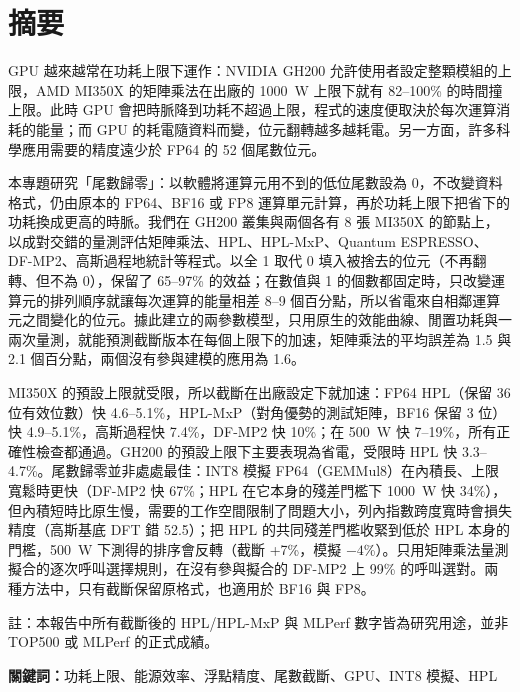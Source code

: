 \chapter*{摘要}

{\linespread{1.3}\selectfont\enlargethispage{\baselineskip}
GPU 越來越常在功耗上限下運作：NVIDIA GH200 允許使用者設定整顆模組的上限，AMD MI350X 的矩陣乘法在出廠的 1000~W 上限下就有 82–100\% 的時間撞上限。此時 GPU 會把時脈降到功耗不超過上限，程式的速度便取決於每次運算消耗的能量；而 GPU 的耗電隨資料而變，位元翻轉越多越耗電。另一方面，許多科學應用需要的精度遠少於 FP64 的 52 個尾數位元。

本專題研究「尾數歸零」：以軟體將運算元用不到的低位尾數設為 0，不改變資料格式，仍由原本的 FP64、BF16 或 FP8 運算單元計算，再於功耗上限下把省下的功耗換成更高的時脈。我們在 GH200 叢集與兩個各有 8 張 MI350X 的節點上，以成對交錯的量測評估矩陣乘法、HPL、HPL-MxP、Quantum ESPRESSO、DF-MP2、高斯過程地統計等程式。以全 1 取代 0 填入被捨去的位元（不再翻轉、但不為 0），保留了 65–97\% 的效益；在數值與 1 的個數都固定時，只改變運算元的排列順序就讓每次運算的能量相差 8–9 個百分點，所以省電來自相鄰運算元之間變化的位元。據此建立的兩參數模型，只用原生的效能曲線、閒置功耗與一兩次量測，就能預測截斷版本在每個上限下的加速，矩陣乘法的平均誤差為 1.5 與 2.1 個百分點，兩個沒有參與建模的應用為 1.6。

MI350X 的預設上限就受限，所以截斷在出廠設定下就加速：FP64 HPL（保留 36 位有效位數）快 4.6–5.1\%，HPL-MxP（對角優勢的測試矩陣，BF16 保留 3 位）快 4.9–5.1\%，高斯過程快 7.4\%，DF-MP2 快 10\%；在 500~W 快 7–19\%，所有正確性檢查都通過。GH200 的預設上限下主要表現為省電，受限時 HPL 快 3.3–4.7\%。尾數歸零並非處處最佳：INT8 模擬 FP64（GEMMul8）在內積長、上限寬鬆時更快（DF-MP2 快 67\%；HPL 在它本身的殘差門檻下 1000~W 快 34\%），但內積短時比原生慢，需要的工作空間限制了問題大小，列內指數跨度寬時會損失精度（高斯基底 DFT 錯 52.5\mEh）；把 HPL 的共同殘差門檻收緊到低於 HPL 本身的門檻，500~W 下測得的排序會反轉（截斷 +7\%，模擬 $-4$\%）。只用矩陣乘法量測擬合的逐次呼叫選擇規則，在沒有參與擬合的 DF-MP2 上 99\% 的呼叫選對。兩種方法中，只有截斷保留原格式，也適用於 BF16 與 FP8。

{\small 註：本報告中所有截斷後的 HPL/HPL-MxP 與 MLPerf 數字皆為研究用途，並非 TOP500 或 MLPerf 的正式成績。\par}

\vspace{0.5em}
\noindent\textbf{關鍵詞：}功耗上限、能源效率、浮點精度、尾數截斷、GPU、INT8 模擬、HPL
\par}


